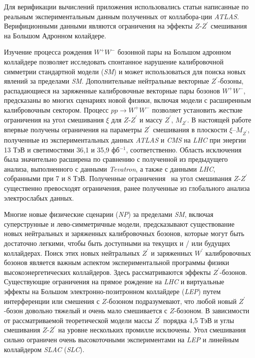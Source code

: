 Для верификации вычислений приложения использовались статьи написанные по реальным экспериментальным данным полученных от коллабора-ции \textit{ATLAS}. Верифиционными данными являются ограничения на эффекты $Z$-${Z}^{\prime}$ смешивания на Большом Адронном колайдере.

Изучение процесса рождения ${W}^{+}{W}^{-}$ бозонной пары на Большом адронном коллайдере позволяет исследовать спонтанное нарушение калибровочной симметрии стандартной модели (\textit{SM}) и может использоваться для поиска новых явлений за пределами \textit{SM}. Дополнительные нейтральные векторные ${Z}^{\prime}$-бозоны, распадающиеся на заряженные калибровочные векторные пары бозонов ${W}^{+}{W}^{-}$, предсказаны во многих сценариях новой физики, включая модели с расширенным калибровочным сектором. Процесс $pp \rightarrow {W}^{+}{W}^{-}$  позволяет установить жесткие ограничения на угол смешивания $\xi$ для $Z$-${Z}^{\prime}$ и массу ${Z}^{\prime}$, ${M}_{{Z}^{\prime}}$. В настоящей работе впервые получены ограничения на параметры ${Z}^{\prime}$ смешивания в плоскости $\xi$–${M}_{{Z}^{\prime}}$, полученные из экспериментальных данных \textit{ATLAS} и \textit{CMS} на \textit{LHC} при энергии 13 ТэВ и светимостями 36,1 и 35,9 фб${}^{−1}$, соответственно. Область исключения была значительно расширена по сравнению с полученной из предыдущего анализа, выполненного с данными \textit{Tevatron}, а также с данными \textit{LHC}, собранными при 7 и 8 ТэВ. Полученные ограничения~\cite{2part-pankov} на угол смешивания $Z$-${Z}^{\prime}$ существенно превосходят ограничения, ранее полученные из глобального анализа электрослабых данных.

Многие новые физические сценарии (\textit{NP}) за пределами \textit{SM}, включая суперструнные и лево-симметричные модели, предсказывают существование новых нейтральных и заряженных калибровочных бозонов, которые могут быть достаточно легкими, чтобы быть доступными на текущих и / или будущих коллайдерах. Поиск этих новых нейтральных ${Z}^{\prime}$ и заряженных ${W}^{\prime}$ калибровочных бозонов является важным аспектом экспериментальной программы физики высокоэнергетических коллайдеров. Здесь рассматриваются  эффекты ${Z}^{\prime}$-бозонов. Существующие ограничения на прямое рождение на \textit{LHC} и виртуальные эффекты на Большом электронно-позитронном коллайдере (\textit{LEP}) путем интерференции или смешения с $Z$-бозоном подразумевают, что любой новый ${Z}^{\prime}$-бозон довольно тяжелый и очень мало смешивается с $Z$-бозоном. В зависимости от рассматриваемой теоретической модели массы ${Z}^{\prime}$ порядка 4,5 ТэВ и углы смешивания $Z$-${Z}^{\prime}$ на уровне нескольких промилле исключены. Угол смешивания сильно ограничен очень высокоточными экспериментами на \textit{LEP} и линейным коллайдером \textit{SLAC} (\textit{SLC}).

